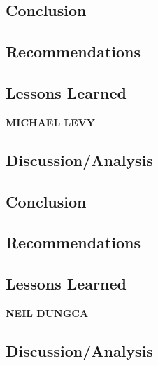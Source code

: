 \documentclass[conference]{IEEEtran}
\begin{document}
\lipsum[56-58]

\subsection{Conclusion}

\lipsum[59-61]

\subsection{Recommendations}

\lipsum[62-64]

\subsection{Lessons Learned}

\lipsum[65-67]


\vspace{10pt} \LARGE \textbf{MICHAEL LEVY} \normalsize

\subsection{Discussion/Analysis}

\lipsum[68-70]

\subsection{Conclusion}

\lipsum[71-73]

\subsection{Recommendations}

\lipsum[73-75]

\subsection{Lessons Learned}

\lipsum[76-78]


\vspace{10pt} \LARGE \textbf{NEIL DUNGCA} \normalsize

\subsection{Discussion/Analysis}
\end{document}
